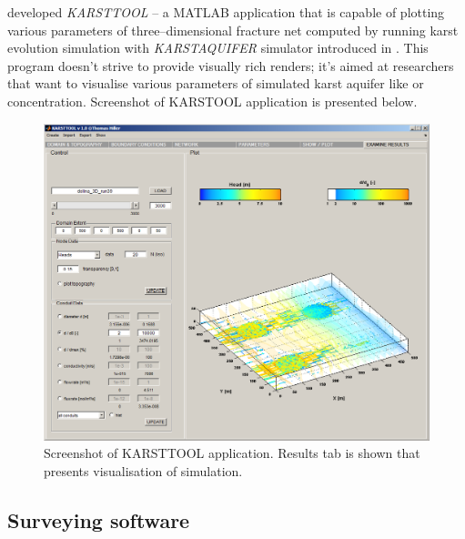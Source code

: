 \Cite{hiller2013} developed \emph{KARSTTOOL} -- a MATLAB application that
is capable of plotting various parameters of three--dimensional fracture net
computed by running karst evolution simulation with \emph{KARSTAQUIFER}
simulator introduced in \cite{Kaufmann200962}. This program doesn't strive to provide visually rich renders; it's
aimed at researchers that want to visualise various parameters of simulated
karst aquifer like  or  concentration. Screenshot of KARSTOOL
application is presented below.

\begin{figure}[h]
  \begin{center}
    \includegraphics[width=\textwidth]{chapters/relatedwork/karsttool.png}
  \end{center}
  \caption{Screenshot of KARSTTOOL application. Results tab is shown that
  presents visualisation of simulation.}
  \label{fig:karsttool}
\end{figure}

\subsection{Surveying software}

